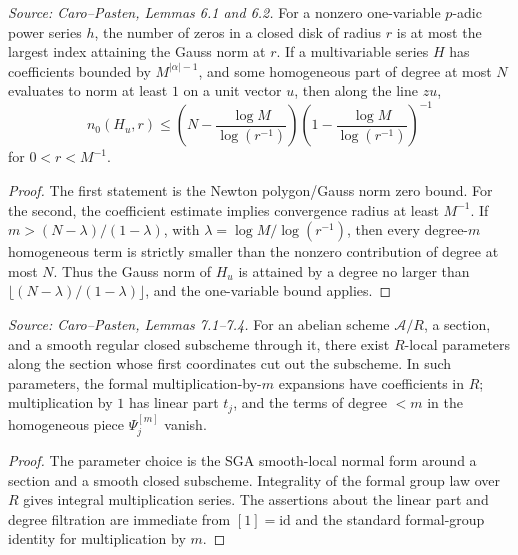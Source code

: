 \begin{lemma}
  \label{lem:cp_zero_estimates}
  \textit{Source: Caro--Pasten, Lemmas 6.1 and 6.2.}
  For a nonzero one-variable \(p\)-adic power series \(h\), the number of
  zeros in a closed disk of radius \(r\) is at most the largest index attaining
  the Gauss norm at \(r\).  If a multivariable series \(H\) has coefficients
  bounded by \(M^{|\alpha|-1}\), and some homogeneous part of degree at most
  \(N\) evaluates to norm at least \(1\) on a unit vector \(u\), then along the
  line \(zu\),
  \[
    n_0(H_u,r)\le
    \left(N-\frac{\log M}{\log(r^{-1})}\right)
    \left(1-\frac{\log M}{\log(r^{-1})}\right)^{-1}
  \]
  for \(0<r<M^{-1}\).
\end{lemma}
\begin{proof}
  The first statement is the Newton polygon/Gauss norm zero bound.  For the
  second, the coefficient estimate implies convergence radius at least
  \(M^{-1}\).  If \(m>(N-\lambda)/(1-\lambda)\), with
  \(\lambda=\log M/\log(r^{-1})\), then every degree-\(m\) homogeneous term is
  strictly smaller than the nonzero contribution of degree at most \(N\).
  Thus the Gauss norm of \(H_u\) is attained by a degree no larger than
  \(\lfloor(N-\lambda)/(1-\lambda)\rfloor\), and the one-variable bound applies.
\end{proof}

\begin{lemma}
  \label{lem:cp_logexp_local_parameters}
  \textit{Source: Caro--Pasten, Lemmas 7.1--7.4.}
  For an abelian scheme \(\mathcal A/R\), a section, and a smooth regular
  closed subscheme through it, there exist \(R\)-local parameters along the
  section whose first coordinates cut out the subscheme.  In such parameters,
  the formal multiplication-by-\(m\) expansions have coefficients in \(R\);
  multiplication by \(1\) has linear part \(t_j\), and the terms of degree
  \(<m\) in the homogeneous piece \(\Psi_j^{[m]}\) vanish.
\end{lemma}
\begin{proof}
  The parameter choice is the SGA smooth-local normal form around a section
  and a smooth closed subscheme.  Integrality of the formal group law over
  \(R\) gives integral multiplication series.  The assertions about the linear
  part and degree filtration are immediate from \([1]=\mathrm{id}\) and the
  standard formal-group identity for multiplication by \(m\).
\end{proof}

